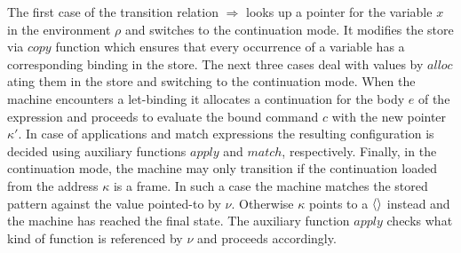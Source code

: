 The first case of the transition relation $\Rightarrow$ looks up a pointer for the variable $x$ in the environment $\rho$ and switches to the continuation mode.
It modifies the store via $\mathit{copy}$ function which ensures that every occurrence of a variable has a corresponding binding in the store.
The next three cases deal with values by $\mathit{alloc}$ating them in the store and switching to the continuation mode.
When the machine encounters a let-binding it allocates a continuation for the body $e$ of the expression and proceeds to evaluate the bound command $c$ with the new pointer $\kappa'$.
In case of applications and match expressions the resulting configuration is decided using auxiliary functions $\mathit{apply}$ and $\mathit{match}$, respectively.
Finally, in the continuation mode, the machine may only transition if the continuation loaded from the address $\kappa$ is a frame.
In such a case the machine matches the stored pattern against the value pointed-to by $\nu$.
Otherwise $\kappa$ points to a $\left<  \right>$ instead and the machine has reached the final state.
The auxiliary function $\mathit{apply}$ checks what kind of function is referenced by $\nu$ and proceeds accordingly.

